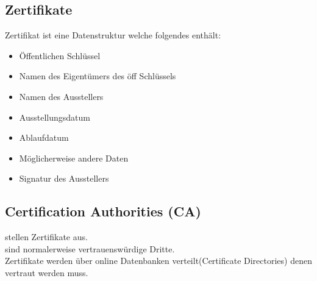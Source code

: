 \documentclass{article} %
\begin{document}
\subsection{Zertifikate}
Zertifikat ist eine Datenstruktur welche folgendes enthält:
\begin{itemize}
	\item Öffentlichen Schlüssel
    \item Namen des Eigentümers des öff Schlüssels
    \item Namen des Ausstellers
    \item Ausstellungsdatum
    \item Ablaufdatum
    \item Möglicherweise andere Daten
    \item Signatur des Ausstellers
\end{itemize}
\subsection{Certification Authorities (CA)}
stellen Zertifikate aus.\\
sind normalerweise vertrauenswürdige Dritte.\\
Zertifikate werden über online Datenbanken verteilt(Certificate Directories) denen vertraut werden muss.

 
\end{document}
